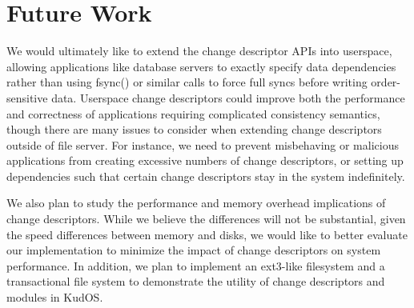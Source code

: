 \preparagraphspacing{}
\section*{Future Work}
\label{sec:future}

We would ultimately like to extend the change descriptor APIs into
userspace, allowing applications like database servers to exactly
specify data dependencies rather than using fsync() or similar calls
to force full syncs before writing order-sensitive data. Userspace
change descriptors could improve both the performance and correctness
of applications requiring complicated consistency semantics, though
there are many issues to consider when extending change descriptors
outside of file server. For instance, we need to prevent misbehaving
or malicious applications from creating excessive numbers of change
descriptors, or setting up dependencies such that certain change
descriptors stay in the system indefinitely.

We also plan to study the performance and memory overhead implications
of change descriptors. While we believe the differences will not be
substantial, given the speed differences between memory and disks, we
would like to better evaluate our implementation to minimize the impact
of change descriptors on system performance. In addition, we plan to
implement an ext3-like filesystem and a transactional file system to
demonstrate the utility of change descriptors and modules in KudOS.
